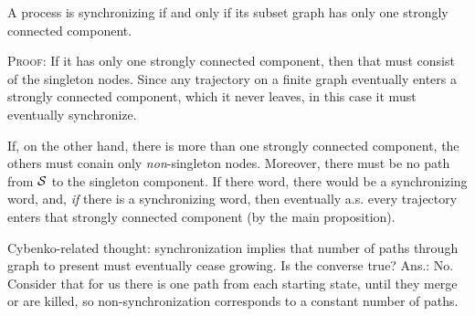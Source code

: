 \documentclass[../new-procedure.tex]{subfiles}
\begin{document}
\begin{proposition}
  A process is synchronizing if and only if its subset graph has only one
  strongly connected component.
\end{proposition}


\textsc{Proof}: If it has only one strongly connected component, then that must
consist of the singleton nodes.  Since any trajectory on a finite graph
eventually enters a strongly connected component, which it never leaves, in
this case it must eventually synchronize.

If, on the other hand, there is more than one strongly connected component, the
others must conain only {\em non}-singleton nodes.  Moreover, there must be no
path from $\mathcal{S}$ to the singleton component.  If there word, there would
be a synchronizing word, and, {\em if} there is a synchronizing word, then
eventually a.s. every trajectory enters that strongly connected component (by
the main proposition).


Cybenko-related thought: synchronization implies that number of paths through
graph to present must eventually cease growing.  Is the converse true?  Ans.:
No.  Consider that for us there is one path from each starting state, until
they merge or are killed, so non-synchronization corresponds to a constant
number of paths.
\end{document}
